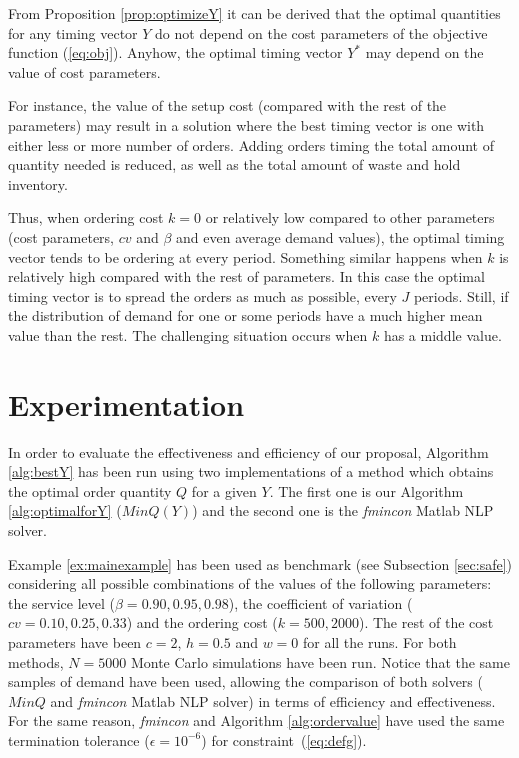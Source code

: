{From Proposition \ref{prop:optimizeY} it can be derived that the optimal quantities for any timing vector $Y$ do not depend on the cost parameters of the objective function (\ref{eq:obj}). Anyhow, the optimal timing vector $Y^*$ may depend  on the value of cost parameters.

For instance, the value of the setup cost (compared with the rest of the parameters) may result in a solution where the best timing vector is one with either less or more number of orders. Adding  orders timing the total amount of quantity needed is reduced, as well as the total amount of waste and hold inventory.

Thus, when ordering cost $k=0$ or relatively low compared to other parameters (cost parameters, $cv$ and $\beta$ and even average demand values), the optimal timing vector tends to be ordering at every period. Something similar happens when $k$ is relatively high compared with the rest of parameters. In this case the optimal timing vector is to spread the orders as much as possible, every $J$ periods. Still, if the distribution of demand for one or some periods have a much higher mean value than the rest. The challenging situation occurs when $k$ has a middle value.








\section{Experimentation}

In order to evaluate the effectiveness and efficiency of our proposal, Algorithm \ref{alg:bestY} has been run using two implementations of a method which obtains the optimal order quantity $Q$ for a given $Y$. The first one is our Algorithm \ref{alg:optimalforY} ($MinQ(Y)$) and the second one is  the \emph{fmincon} Matlab NLP solver.

Example \ref{ex:mainexample} has been used as benchmark (see Subsection \ref{sec:safe}) considering all possible combinations of the values of the following parameters: the service level ($\beta=0.90, 0.95,0.98$), the coefficient of variation ($cv=0.10, 0.25, 0.33$) and the ordering cost ($k=500, 2000$). The rest of the cost parameters have been $c=2$, $h=0.5$ and $w=0$ for all the runs. For both methods,  $N=5000$ Monte Carlo simulations have been run. Notice that the same samples of demand have been used, allowing the comparison of both solvers ($MinQ$ and \emph{fmincon} Matlab NLP solver) in terms of efficiency and effectiveness. For the same reason,  \emph{fmincon} and Algorithm  \ref{alg:ordervalue} have used the same termination tolerance ($\epsilon=10^{-6}$)  for constraint~(\ref{eq:defg}).

}

